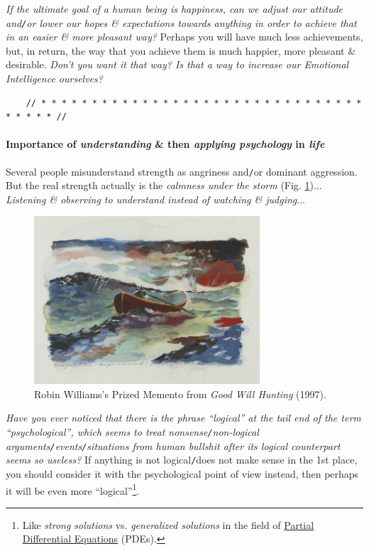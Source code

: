 \documentclass[12pt]{article}
\begin{document}
{\it If the ultimate goal of a human being is happiness, can we adjust our attitude and{\tt/}or lower our hopes \& expectations towards anything in order to achieve that in an easier \& more pleasant way?} Perhaps you will have much less achievements, but, in return, the way that you achieve them is much happier, more pleasant \& desirable. {\it Don't you want it that way? Is that a way to increase our Emotional Intelligence ourselves?}

\begin{verbatim}
	// * * * * * * * * * * * * * * * * * * * * * * * * * * * * * * * * * * * * * //
\end{verbatim}

\paragraph{Importance of {\it understanding} \& then {\it applying psychology} in {\it life}}

\noindent{} Several people misunderstand strength as angriness and{\tt/}or dominant aggression. But the real strength actually is the {\it calmness under the storm} (Fig. \ref{fig6})$\ldots$ {\it Listening \& observing to understand instead of watching \& judging}$\ldots$

\begin{figure}[h]
	\centering
	\includegraphics[width=0.75\textwidth]{boat_under_storm}
	\caption{Robin Williams's Prized Memento from {\it Good Will Hunting} (1997).}
	\label{fig6}
\end{figure}
{\it Have you ever noticed that there is the phrase ``logical'' at the tail end of the term ``psychological'', which seems to treat nonsense{\tt/}non-logical arguments{\tt/}events{\tt/}situations from human bullshit after its logical counterpart seems so useless?} If anything is not logical{\tt/}does not make sense in the 1st place, you should consider it with the psychological point of view instead, then perhaps it will be even more ``logical''\footnote{Like {\it strong solutions} vs. {\it generalized solutions} in the field of \href{https://en.wikipedia.org/wiki/Partial_differential_equation}{Partial Differential Equations} (PDEs).}.
\end{document}
